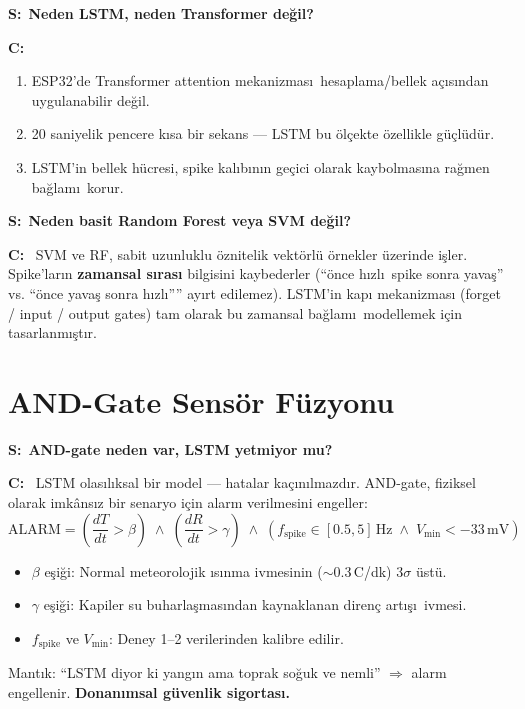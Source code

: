 \documentclass[11pt,a4paper]{article}
\newcommand{\soru}[1]{\vskip12pt\noindent\textcolor{ember}{\textbf{S:}}~\textbf{#1}\par\vskip4pt\noindent\textcolor{myco}{\textbf{C:}}~}
\begin{document}
\soru{Neden LSTM, neden Transformer de\u{g}il?}
\begin{enumerate}
  \item ESP32'de Transformer attention mekanizmas\i\ hesaplama/bellek a\c{c}\i s\i ndan uygulanabilir de\u{g}il.
  \item 20 saniyelik pencere k\i sa bir sekans --- LSTM bu \"ol\c{c}ekte \"ozellikle g\"u\c{c}l\"ud\"ur.
  \item LSTM'in bellek h\"ucresi, spike kal\i b\i n\i n ge\c{c}ici olarak kaybolmas\i na ra\u{g}men ba\u{g}lam\i\ korur.
\end{enumerate}

\soru{Neden basit Random Forest veya SVM de\u{g}il?}
SVM ve RF, sabit uzunluklu \"oznitelik vekt\"orl\"u \"ornekler \"uzerinde i\c{s}ler. Spike'lar\i n \textbf{zamansal s\i ras\i} bilgisini kaybederler (``\"once h\i zl\i\ spike sonra yava\c{s}'' vs. ``\"once yava\c{s} sonra h\i zl\i'''' ay\i rt edilemez). LSTM'in kapı mekanizması (forget / input / output gates) tam olarak bu zamansal ba\u{g}lam\i\ modellemek i\c{c}in tasarlanm\i\c{s}t\i r.

\section{AND-Gate Sens\"or F\"uzyonu}

\soru{AND-gate neden var, LSTM yetmiyor mu?}
LSTM olas\i l\i ksal bir model --- hatalar ka\c{c}\i n\i lmazd\i r. AND-gate, fiziksel olarak imk\^ans\i z bir senaryo i\c{c}in alarm verilmesini engeller:
\[
  \text{ALARM} = \left(\frac{dT}{dt} > \beta\right) \;\wedge\; \left(\frac{dR}{dt} > \gamma\right) \;\wedge\; \left(f_{\mathrm{spike}} \in [0.5, 5]\,\mathrm{Hz} \;\wedge\; V_{\min} < -33\,\mathrm{mV}\right)
\]
\begin{itemize}[leftmargin=1.2cm]
  \item $\beta$ e\c{s}i\u{g}i: Normal meteorolojik \i s\i nma ivmesinin ($\sim$0.3\,\textdegree C/dk) 3$\sigma$ \"ust\"u.
  \item $\gamma$ e\c{s}i\u{g}i: Kapiler su buharla\c{s}mas\i ndan kaynaklanan diren\c{c} art\i\c{s}\i\ ivmesi.
  \item $f_{\mathrm{spike}}$ ve $V_{\min}$: Deney 1--2 verilerinden kalibre edilir.
\end{itemize}
Mant\i k: ``LSTM diyor ki yang\i n ama toprak so\u{g}uk ve nemli'' $\Rightarrow$ alarm engellenir. \textbf{Donan\i msal g\"uvenlik sigortas\i.}
\end{document}
